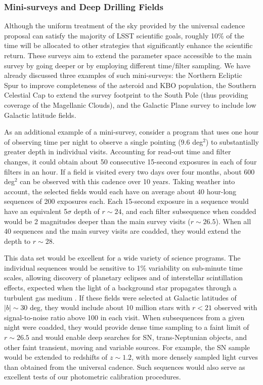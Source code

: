 \subsubsection{ Mini-surveys and Deep Drilling Fields}
\label{Sec:minisurveys}

Although the uniform treatment of the sky provided by the universal cadence
proposal can satisfy the majority of LSST scientific goals, roughly 10\%
of the time will be allocated to other strategies that significantly enhance the
scientific return.  These surveys aim to extend the parameter space accessible
to the main survey by going deeper or by employing different time/filter
sampling.  We have already discussed three examples of such
mini-surveys: the Northern Ecliptic Spur to improve completeness of
the asteroid and KBO population, the Southern Celestial Cap to extend
the survey footprint to the South Pole (thus providing coverage of the
Magellanic Clouds), and the Galactic Plane survey to include low
Galactic latitude fields.

As an additional  example of a mini-survey, consider a program that
uses one hour of
observing time per night to observe a single pointing (9.6 deg$^2$) to
substantially greater depth in individual visits. Accounting for
read-out time and filter changes, it could obtain about 50 consecutive
15-second exposures in each of four filters in an hour. If a field is visited
every two days over four months, about 600 deg$^2$ can be observed with this
cadence over 10 years. Taking weather into account, the selected fields would
each have on average about 40 hour-long sequences of 200 exposures each. Each
15-second exposure in a sequence would have an equivalent 5$\sigma$ depth of
$r\sim24$, and each filter subsequence when coadded would be 2 magnitudes
deeper than the main survey visits ($r\sim26.5$). When all 40 sequences and
the main survey visits are coadded, they would extend the depth to $r\sim28$.

This data set would be excellent for a wide variety of science programs. The
individual sequences would be sensitive to 1\% variability on sub-minute time
scales, allowing discovery of planetary eclipses and of interstellar scintillation 
effects, expected when the light of a background star propagates through a 
turbulent gas medium \citep{2003A&A...412..105M, 2011A&A...525A.108H}. 
If these fields were selected
at Galactic latitudes of $|b|\sim30$ deg, they would include about 10 million
stars with $r<21$ observed with signal-to-noise ratio above 100 in each visit.
When subsequences from a given night were coadded, they would
provide dense time sampling to a faint limit of $r\sim26.5$
and would enable deep searches
for SN, trans-Neptunian objects, and other faint transient, moving and
variable sources.  For example, the SN sample
would be extended to redshifts of $z\sim1.2$, with more densely sampled light
curves than obtained from the universal cadence. Such sequences would also
serve as excellent tests of our photometric calibration procedures.

